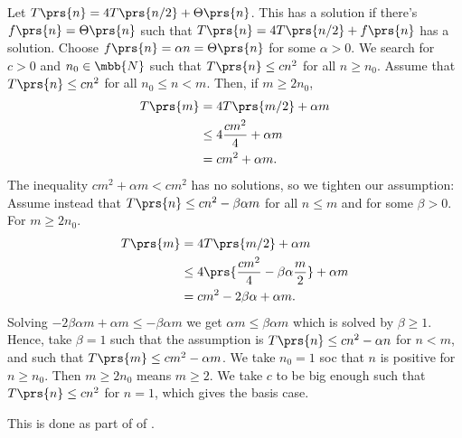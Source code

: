 \documentclass[oneside]{scrbook}
\theoremstyle{definition}
\begin{document}
\begin{exercise}
\begin{enumerate}[label=\alph*.]
        Let $T\prs{n} = 4 T\prs{n/2} + \Theta\prs{n}$. This has a solution if there's $f\prs{n} = \Theta\prs{n}$ such that $T\prs{n} = 4 T\prs{n/2} + f\prs{n}$ has a solution. Choose $f\prs{n} = \alpha n = \Theta\prs{n}$ for some $\alpha > 0$.
        We search for $c > 0$ and $n_0 \in \mbb{N}$ such that $T\prs{n} \leq c n^2$ for all $n \geq n_0$.
        Assume that $T\prs{n} \leq c n^2$ for all $n_0 \leq n < m$. Then, if $m \geq 2 n_0$,
        \begin{align*}
        T\prs{m} &= 4 T\prs{m/2} + \alpha m
        \\&\leq 4 \frac{cm^2}{4} + \alpha m
        \\&= cm^2 + \alpha m \text{.}
        \end{align*}
        The inequality $cm^2 + \alpha m < c m^2$ has no solutions, so we tighten our assumption: Assume instead that $T\prs{n} \leq cn^2 - \beta \alpha m$ for all $n \leq m$ and for some $\beta > 0$.
        For $m \geq 2 n_0$.
        \begin{align*}
            T\prs{m} &= 4 T\prs{m/2} + \alpha m
            \\&\leq 4 \prs{\frac{c m^2}{4} - \beta \alpha \frac{m}{2}} + \alpha m
            \\&= cm^2 - 2 \beta \alpha + \alpha m \text{.}
        \end{align*}
        Solving $-2\beta \alpha m + \alpha m \leq -\beta \alpha m$ we get $\alpha m \leq \beta \alpha m$ which is solved by $\beta \geq 1$. Hence, take $\beta = 1$ such that the assumption is $T\prs{n} \leq c n^2 - \alpha n$ for $n < m$, and such that $T\prs{m} \leq cm^2 - \alpha m$.
        We take $n_0 = 1$ soc that $n$ is positive for $n \geq n_0$. Then $m \geq 2 n_0$ means $m \geq 2$. We take $c$ to be big enough such that $T\prs{n} \leq cn^2$ for $n = 1$, which gives the basis case.
    \end{enumerate}
\end{exercise}

\begin{exercise}
    This is done as part of  of .
\end{exercise}
\end{document}
